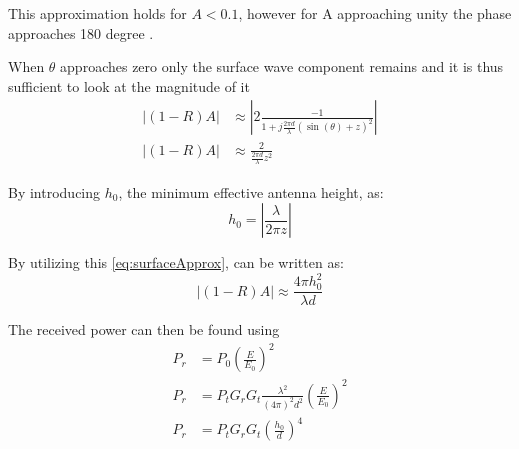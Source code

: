 This approximation holds for $A<0.1$, however for A approaching unity the phase approaches 180 degree \citep{Bullington}. 

When $\theta$ approaches zero only the surface wave component remains and it is thus sufficient to look at the magnitude of it \citep{Chong}
\begin{align}
|(1-R)A| &\approx \left|2 \frac{-1}{1+j\frac{2\pi d}{\lambda}\left(\sin(\theta)+z\right)^2} \right| \\
|(1-R)A| &\approx \frac{2}{\frac{2\pi d}{\lambda}z^2} \label{eq:surfaceApprox}
\end{align}

By introducing $h_0$, the minimum effective antenna height, as:
\begin{equation}
h_0=\left| \frac{\lambda}{2\pi z} \right|
\end{equation} 
\begin{where}
\end{where}

By utilizing this \autoref{eq:surfaceApprox}, can be written as:
\begin{equation}
|(1-R)A| \approx \frac{4 \pi h_0^2}{\lambda d}
\end{equation}

The received power can then be found using \citep{Chong}
\begin{align}
P_r&=P_0 \left(\frac{E}{E_0}\right)^2 \\
P_r&=P_tG_rG_t\frac{\lambda^2}{(4\pi )^2 d^2} \left(\frac{E}{E_0}\right)^2\\
P_r&=P_tG_rG_t\left(\frac{h_0}{d}\right)^4
\end{align}
\begin{where}
\end{where}


















